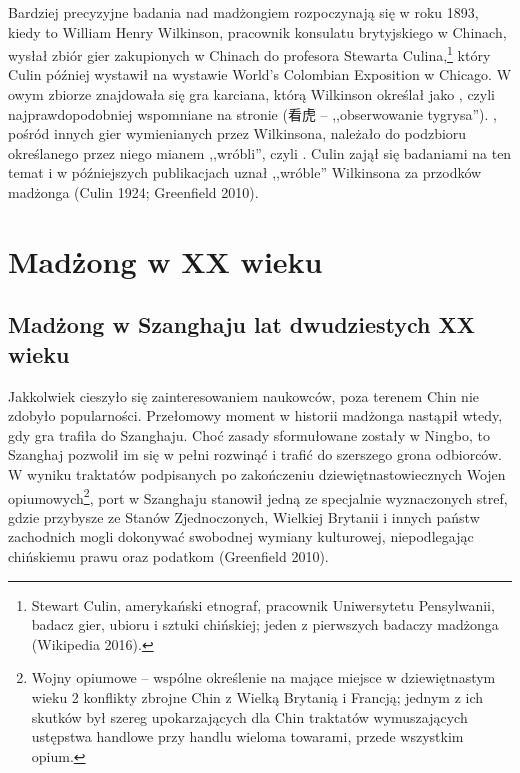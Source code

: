 Bardziej precyzyjne badania nad madżongiem rozpoczynają się w roku 1893, kiedy
to William Henry Wilkinson, pracownik konsulatu brytyjskiego w Chinach, wysłał
zbiór gier zakupionych w Chinach do profesora Stewarta Culina,\footnote{Stewart
Culin, amerykański etnograf, pracownik Uniwersytetu Pensylwanii, badacz gier,
ubioru i sztuki chińskiej; jeden z pierwszych badaczy madżonga (Wikipedia
2016).} który Culin później wystawił na wystawie World's Colombian Exposition w
Chicago. W owym zbiorze znajdowała się gra karciana, którą Wilkinson określał
jako , czyli najprawdopodobniej wspomniane na stronie
\pageref{kanhu}  (看虎  -- ,,obserwowanie tygrysa'').
, pośród innych gier wymienianych przez Wilkinsona, należało do
podzbioru określanego przez niego mianem ,,wróbli'', czyli . Culin
zajął się badaniami na ten temat i w późniejszych publikacjach uznał ,,wróble''
Wilkinsona za przodków madżonga (Culin 1924; Greenfield 2010).

\section{Madżong w XX wieku}

\subsection{Madżong w Szanghaju lat dwudziestych XX wieku}
\label{shanghai20s}
Jakkolwiek  cieszyło się zainteresowaniem naukowców, poza
terenem Chin nie zdobyło popularności. Przełomowy moment w historii madżonga nastąpił wtedy,
gdy gra trafiła do Szanghaju. Choć zasady sformułowane zostały w Ningbo, to
Szanghaj pozwolił im się w pełni rozwinąć i trafić do szerszego grona odbiorców.
W wyniku traktatów podpisanych po zakończeniu dziewiętnastowiecznych Wojen
opiumowych\footnote{Wojny opiumowe – wspólne określenie na mające miejsce w
dziewiętnastym wieku 2 konflikty zbrojne Chin z Wielką Brytanią i Francją;
jednym z ich skutków był szereg upokarzających dla Chin traktatów wymuszających
ustępstwa handlowe przy handlu wieloma towarami, przede wszystkim opium.}, port
w Szanghaju stanowił jedną ze specjalnie wyznaczonych stref, gdzie przybysze ze
Stanów Zjednoczonych, Wielkiej Brytanii i innych państw zachodnich mogli
dokonywać swobodnej wymiany kulturowej, niepodlegając chińskiemu prawu oraz
podatkom (Greenfield 2010).

